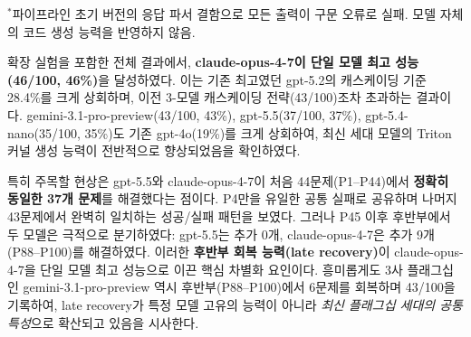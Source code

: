 \documentclass[sigplan,screen,review,anonymous]{acmart}
\begin{document}
\begin{table}[t]
\centering
\caption{모델별 KernelBench 정확도 비교(Fast-0). $^\dagger$gpt-4o 실패 문제에 대해서만 실행(cascading strategy). $^\ddagger$Level~1만 평가(확장 실험). $^{\S}$Level~1 P1--20 부분집합을 KernelAgent(best-of-4)로 평가한 RL 특화 오픈 모델.}
\label{tab:model_comparison}
\vspace{2pt}
\raggedright
\footnotesize{$^{*}$파이프라인 초기 버전의 응답 파서 결함으로 모든 출력이 구문 오류로 실패. 모델 자체의 코드 생성 능력을 반영하지 않음.}
\end{table}

확장 실험을 포함한 전체 결과에서, \textbf{claude-opus-4-7이 단일 모델 최고 성능(46/100, 46\%)}을 달성하였다. 이는 기존 최고였던 gpt-5.2의 캐스케이딩 기준 28.4\%를 크게 상회하며, 이전 3-모델 캐스케이딩 전략(43/100)조차 초과하는 결과이다. gemini-3.1-pro-preview(43/100, 43\%), gpt-5.5(37/100, 37\%), gpt-5.4-nano(35/100, 35\%)도 기존 gpt-4o(19\%)를 크게 상회하여, 최신 세대 모델의 Triton 커널 생성 능력이 전반적으로 향상되었음을 확인하였다.

특히 주목할 현상은 gpt-5.5와 claude-opus-4-7이 처음 44문제(P1--P44)에서 \textbf{정확히 동일한 37개 문제}를 해결했다는 점이다. P4만을 유일한 공통 실패로 공유하며 나머지 43문제에서 완벽히 일치하는 성공/실패 패턴을 보였다. 그러나 P45 이후 후반부에서 두 모델은 극적으로 분기하였다: gpt-5.5는 추가 0개, claude-opus-4-7은 추가 9개(P88--P100)를 해결하였다. 이러한 \textbf{후반부 회복 능력(late recovery)}이 claude-opus-4-7을 단일 모델 최고 성능으로 이끈 핵심 차별화 요인이다. 흥미롭게도 3사 플래그십인 gemini-3.1-pro-preview 역시 후반부(P88--P100)에서 6문제를 회복하며 43/100을 기록하여, late recovery가 특정 모델 고유의 능력이 아니라 \emph{최신 플래그십 세대의 공통 특성}으로 확산되고 있음을 시사한다.
\end{document}
